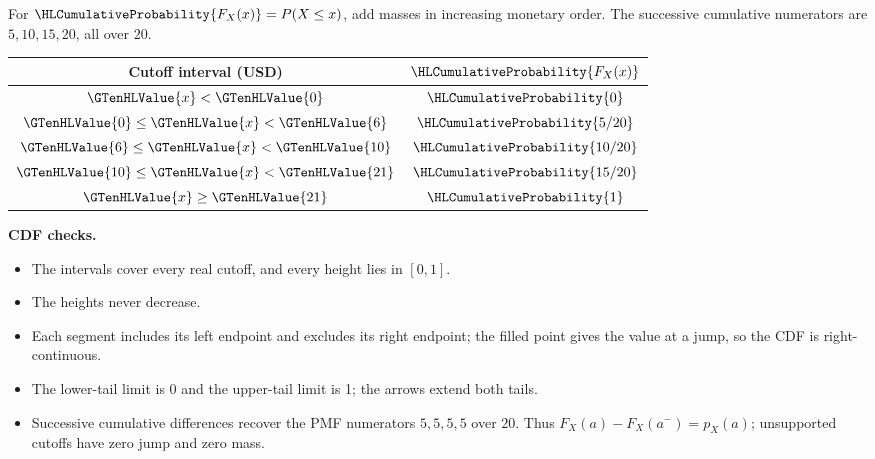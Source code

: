For $\HLCumulativeProbability{F_X(x)}=P(X\leq x)$, add masses in increasing monetary order. The successive cumulative numerators are $5,10,15,20$, all over $20$.
\begin{center}
\begin{tabular}{cc}\toprule
Cutoff interval (USD) & $\HLCumulativeProbability{F_X(x)}$\\
\midrule
$\GTenHLValue{x}<\GTenHLValue{0}$ & $\HLCumulativeProbability{0}$\\
$\GTenHLValue{0}\leq \GTenHLValue{x}<\GTenHLValue{6}$ & $\HLCumulativeProbability{5/20}$\\
$\GTenHLValue{6}\leq \GTenHLValue{x}<\GTenHLValue{10}$ & $\HLCumulativeProbability{10/20}$\\
$\GTenHLValue{10}\leq \GTenHLValue{x}<\GTenHLValue{21}$ & $\HLCumulativeProbability{15/20}$\\
$\GTenHLValue{x}\geq \GTenHLValue{21}$ & $\HLCumulativeProbability{1}$\\
\bottomrule\end{tabular}
\end{center}
\begin{center}\end{center}\textbf{CDF checks.}\begin{itemize}\item The intervals cover every real cutoff, and every height lies in $[0,1]$.\item The heights never decrease.\item Each segment includes its left endpoint and excludes its right endpoint; the filled point gives the value at a jump, so the CDF is right-continuous.\item The lower-tail limit is 0 and the upper-tail limit is 1; the arrows extend both tails.\item Successive cumulative differences recover the PMF numerators $5,5,5,5$ over $20$. Thus $F_X(a)-F_X(a^-)=p_X(a)$; unsupported cutoffs have zero jump and zero mass.\end{itemize}

